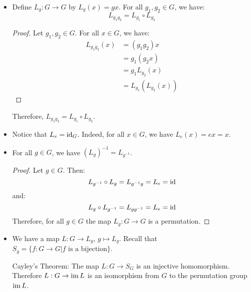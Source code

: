 \begin{itemize}
\begin{proof}
    \end{proof}
    \begin{warning}
        The converse is not necessarily true. Note that if $G$ is non-abelian, $H$ is any group, and $\phi:G\rightarrow H$ is the trivial homomorphism, then $\phi(G) = \{e\}$, which is cyclic (hence abelian), but $G$ is non-abelian (hence non-cyclic).
    \end{warning}
    \item Define $L_g : G\rightarrow G$ by $L_g(x)=gx$. For all $g_1,g_2 \in  G$, we have:
    \begin{equation}
        L_{g_1g_2}=L_{g_1} \circ L_{g_2}
    \end{equation}
    \begin{proof}
        Let $g_1,g_2 \in G$. For all $x\in G$, we have:
        \begin{align}
            L_{g_1g_2}(x) &= (g_1g_2)x \\ 
            &= g_1(g_2x) \\ 
            &= g_1 L_{g_2}(x) \\ 
            &= L_{g_1}(L_{g_2}(x))
        \end{align}
    \end{proof}
    Therefore, $L_{g_1g_2}=L_{g_1}\circ L_{g_2}$.
    \item Notice that $L_e = \text{id}_{G}$. Indeed, for all $x\in G$, we have $L_e(x)=ex=x$.
    \item For all $g\in G$, we have $(L_g)^{-1}=L_{g^{-1}}$.
    \begin{proof}
        Let $g\in G$. Then:
        \begin{equation}
            L_{g^{-1}}\circ L_g = L_{g^{-1}g} = L_e = \text{id} 
        \end{equation}
        and:
        \begin{equation}
            L_{g} \circ L_{g^{-1}} = L_{gg^{-1}} = L_e = \text{id}
        \end{equation}
        Therefore, for all $g\in G$ the map $L_g:G\rightarrow G$ is a permutation.
    \end{proof}
    \item We have a map $L:G \rightarrow L_g$, $g\mapsto L_g$. Recall that $S_g=\{f:G\to G|f\text{ is a bijection}\}$.
    \begin{theorem}
        Cayley's Theorem: The map $L:G\rightarrow S_G$ is an injective homomorphism. Therefore $L:G\rightarrow \operatorname{im} L$ is an isomorphism from $G$ to the permutation group $\operatorname{im} L$.
    \end{theorem}

\end{itemize}
